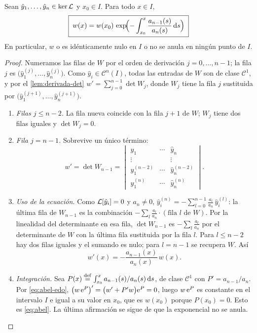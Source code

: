 \begin{teorema}\label{teo:abel}
Sean $\hat y_1,\dots,\hat y_n\in\operatorname{ker}\mathcal{L}$ y $x_0\in I$. Para todo $x\in I$,
\begin{equation}\label{eq:abel}
  \boxed{\;w(x)=w(x_0)\,\exp\!\Bigl(-\int_{x_0}^{x}\frac{a_{n-1}(s)}{a_n(s)}\,\mathrm{d} s\Bigr)\;}
\end{equation}
En particular, $w$ o es idénticamente nulo en $I$ o no se anula en ningún
punto de $I$.
\end{teorema}

\begin{proof}
Numeramos las filas de $W$ por el orden de derivación $j=0,\dots,n-1$; la
fila $j$ es $\bigl(\hat y_1^{(j)},\dots,\hat y_n^{(j)}\bigr)$. Como
$\hat y_i\in\mathcal C^{n}(I)$, todas las entradas de $W$ son de clase
$\mathcal C^{1}$, y por el \cref{lem:derivada-det}
$w'=\sum_{j=0}^{n-1}\det W_j$, donde $W_j$ tiene la fila $j$ sustituida por
$\bigl(\hat y_1^{(j+1)},\dots,\hat y_n^{(j+1)}\bigr)$.
\begin{enumerate}[label=\textcolor{cian}{\arabic*.}, leftmargin=1.5em, itemsep=3pt]
  \item \emph{Filas $j\le n-2$.} La fila nueva coincide con la fila $j+1$
        de $W$; $W_j$ tiene dos filas iguales y $\det W_j=0$.
  \item \emph{Fila $j=n-1$.} Sobrevive un único término:
        \[
          w'=\det W_{n-1}=
          \begin{vmatrix}
            \hat y_1 & \cdots & \hat y_n\\
            \vdots & & \vdots\\
            \hat y_1^{(n-2)} & \cdots & \hat y_n^{(n-2)}\\
            \hat y_1^{(n)} & \cdots & \hat y_n^{(n)}
          \end{vmatrix}.
        \]
  \item \emph{Uso de la ecuación.} Como $\mathcal{L}[\hat y_i]=0$ y $a_n\neq0$,
        $\hat y_i^{(n)}=-\sum_{l=0}^{n-1}\frac{a_l}{a_n}\,\hat y_i^{(l)}$: la
        última fila de $W_{n-1}$ es la combinación
        $-\sum_{l}\frac{a_l}{a_n}\cdot(\text{fila }l\text{ de }W)$. Por la
        linealidad del determinante en esa fila, $\det W_{n-1}$ es
        $-\sum_l\frac{a_l}{a_n}$ por el determinante de $W$ con la última fila
        sustituida por la fila $l$. Para $l\le n-2$ hay dos filas iguales y
        el sumando es nulo; para $l=n-1$ se recupera $W$. Así
        \begin{equation}\label{eq:abel-edo}
          w'(x)=-\frac{a_{n-1}(x)}{a_n(x)}\,w(x).
        \end{equation}
  \item \emph{Integración.} Sea
        $P(x)\mathrel{\overset{\mathrm{def}}{=}}\int_{x_0}^{x}a_{n-1}(s)/a_n(s)\,\mathrm{d} s$, de clase
        $\mathcal C^{1}$ con $P'=a_{n-1}/a_n$. Por \eqref{eq:abel-edo},
        $\bigl(w\,\mathrm{e}^{P}\bigr)'=\bigl(w'+P'w\bigr)\mathrm{e}^{P}=0$, luego
        $w\,\mathrm{e}^{P}$ es constante en el intervalo $I$ e igual a su valor en
        $x_0$, que es $w(x_0)$ porque $P(x_0)=0$. Esto es \eqref{eq:abel}.
        La última afirmación se sigue de que la exponencial no se anula.\qedhere
\end{enumerate}
\end{proof}

